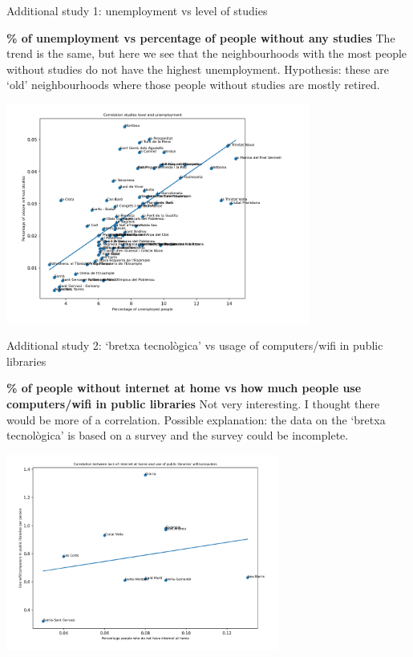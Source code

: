 \documentclass[8pt]{beamer}
\begin{document}
\begin{frame}{Additional study 1: unemployment vs level of studies}

\begin{block}{\textbf{\% of unemployment vs percentage of people without any studies}} 
The trend is the same, but here we see that the neighbourhoods with the most people without studies do not have the highest unemployment. Hypothesis: these are `old' neighbourhoods where those people without studies are mostly retired.
\end{block}

\includegraphics[width=10cm]{correlation_studies_level_unemployment_neighborhoods.png}



\end{frame}

\begin{frame}{Additional study 2: `bretxa tecnol\`{o}gica' vs usage of computers/wifi in public libraries}
\small{
\begin{block}{\textbf{\% of people without internet at home vs how much people use computers/wifi in public libraries}} 
Not very interesting. I thought there would be more of a correlation. Possible explanation: the data on the `bretxa tecnol\`{o}gica' is based on a survey and the survey could be incomplete.
\end{block}}

\includegraphics[width=9cm]{bretxa_tecno_biblioteques.png}



\end{frame}
\end{document}
